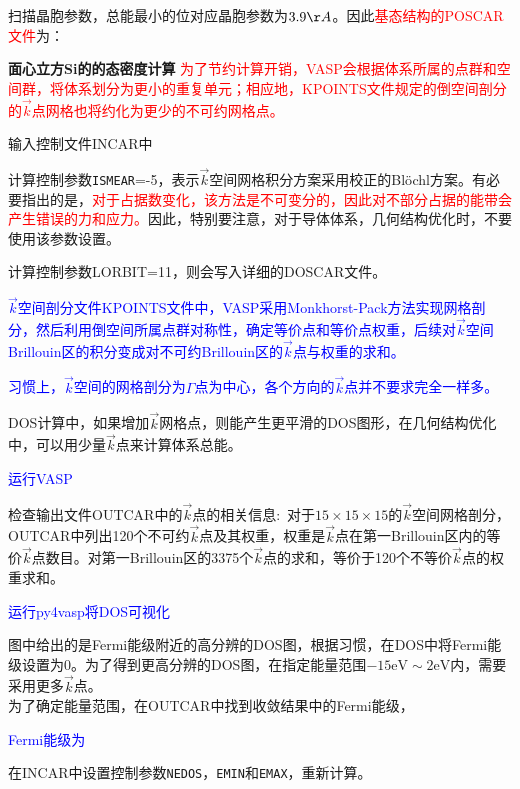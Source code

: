扫描晶胞参数，总能最小的位对应晶胞参数为$3.9\AA$。因此\textcolor{red}{基态结构的\textrm{POSCAR}文件}为：

\textbf{面心立方\rm{Si}的的态密度计算}
\textcolor{red}{为了节约计算开销，\textrm{VASP}会根据体系所属的点群和空间群，将体系划分为更小的重复单元；相应地，\textrm{KPOINTS}文件规定的倒空间剖分的$\vec k$点网格也将约化为更少的不可约网格点。}

输入控制文件\textrm{INCAR}中

计算控制参数\texttt{ISMEAR}=-5，表示$\vec k$空间网格积分方案采用校正的\textrm{Bl\"ochl}方案。有必要指出的是，\textcolor{red}{对于占据数变化，该方法是不可变分的，因此对不部分占据的能带会产生错误的力和应力。}因此，特别要注意，对于导体体系，几何结构优化时，不要使用该参数设置。

计算控制参数\textrm{LORBIT}=11，则会写入详细的\textrm{DOSCAR}文件。

\textcolor{blue}{$\vec k$空间剖分文件\textrm{KPOINTS}文件中，\textrm{VASP}采用\textrm{Monkhorst-Pack}方法实现网格剖分，然后利用倒空间所属点群对称性，确定等价点和等价点权重，后续对$\vec k$空间\textrm{Brillouin}区的积分变成对不可约\textrm{Brillouin}区的$\vec k$点与权重的求和。

习惯上，$\vec k$空间的网格剖分为$\Gamma$点为中心，各个方向的$\vec k$点并不要求完全一样多。}

\textrm{DOS}计算中，如果增加$\vec k$网格点，则能产生更平滑的\textrm{DOS}图形，在几何结构优化中，可以用少量$\vec k$点来计算体系总能。

\textcolor{blue}{运行\textrm{VASP}}

检查输出文件\textrm{OUTCAR}中的$\vec k$点的相关信息:~对于$15\times15\times15$的$\vec k$空间网格剖分，\textrm{OUTCAR}中列出120个不可约$\vec k$点及其权重，权重是$\vec k$点在第一\textrm{Brillouin}区内的等价$\vec k$点数目。对第一\textrm{Brillouin}区的3375个$\vec k$点的求和，等价于120个不等价$\vec k$点的权重求和。

\textcolor{blue}{运行\textrm{py4vasp}将\textrm{DOS}可视化}

图中给出的是\textrm{Fermi}能级附近的高分辨的\textrm{DOS}图，根据习惯，在\textrm{DOS}中将\textrm{Fermi}能级设置为0。为了得到更高分辨的\textrm{DOS}图，在指定能量范围$-15\mathrm{eV}\sim2\mathrm{eV}$内，需要采用更多$\vec k$点。\\为了确定能量范围，在\textrm{OUTCAR}中找到收敛结果中的\textrm{Fermi}能级，

\textcolor{blue}{\textrm{Fermi}能级为}

在\textrm{INCAR}中设置控制参数\texttt{NEDOS}，\texttt{EMIN}和\texttt{EMAX}，重新计算。

